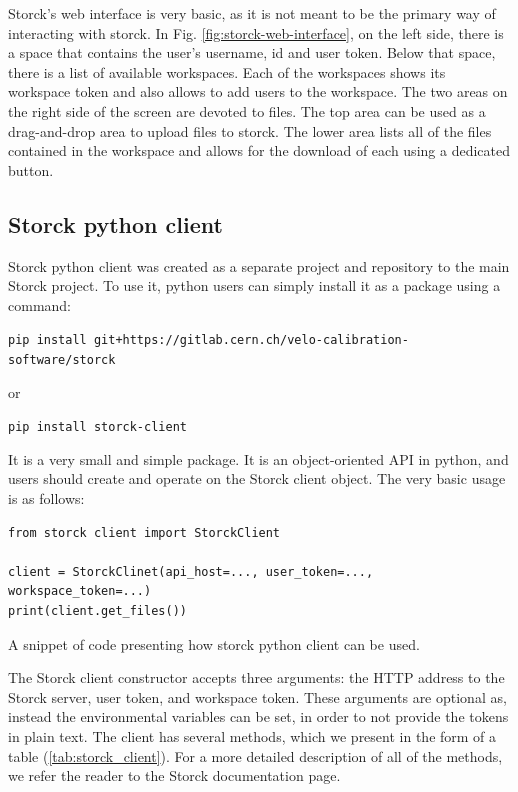 Storck's web interface is very basic, as it is not meant to be the primary way of interacting with storck.
In Fig. \ref{fig:storck-web-interface}, on the left side, there is a space that contains the user's username, id and user token.
Below that space, there is a list of available workspaces.
Each of the workspaces shows its workspace token and also allows to add users to the workspace.
The two areas on the right side of the screen are devoted to files.
The top area can be used as a drag-and-drop area to upload files to storck.
The lower area lists all of the files contained in the workspace and allows for the download of each using a dedicated button.


\subsection{Storck python client}

Storck python client was created as a separate project and repository to the main Storck project.
To use it, python users can simply install it as a package using a command:

\texttt{pip install git+https://gitlab.cern.ch/velo-calibration-software/storck}

or

\texttt{pip install storck-client}

\noindent It is a very small and simple package. It is an object-oriented API in python, and users should create and operate on the Storck client object.
The very basic usage is as follows:


\begin{listing}[!ht]
\begin{verbatim}
from storck client import StorckClient

client = StorckClinet(api_host=..., user_token=..., workspace_token=...)
print(client.get_files())

\end{verbatim}
\caption{A snippet of code presenting how storck python client can be used.}
\label{listing:storck_client}
\end{listing}

The Storck client constructor accepts three arguments: the HTTP address to the Storck server, user token, and workspace token.
These arguments are optional as, instead the environmental variables can be set, in order to not provide the tokens in plain text.
The client has several methods, which we present in the form of a table (\ref{tab:storck_client}).
For a more detailed description of all of the methods, we refer the reader to the Storck documentation page\cite{storckdock}.



